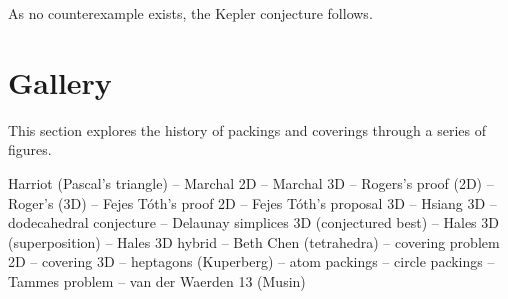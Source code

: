As no counterexample exists, the Kepler conjecture follows.

\section{Gallery}

This section explores the history of packings and coverings through a
series of figures.

Harriot (Pascal's triangle) -- Marchal 2D -- Marchal 3D -- Rogers's
proof (2D) -- Roger's (3D) -- Fejes T\'oth's proof 2D -- Fejes
T\'oth's proposal 3D -- Hsiang 3D -- dodecahedral conjecture --
Delaunay simplices 3D (conjectured best) -- Hales 3D (superposition)
-- Hales 3D hybrid -- Beth Chen (tetrahedra) -- covering problem 2D --
covering 3D -- heptagons (Kuperberg) -- atom packings -- circle
packings -- Tammes problem -- van der Waerden 13 (Musin)
